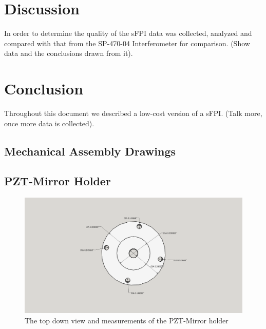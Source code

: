 \documentclass[12pt,journal]{IEEEtran}
\begin{document}
\section{Discussion}
In order to determine the quality of the sFPI data was collected, analyzed and compared with that from the SP-470-04 Interferometer for comparison. (Show data and the conclusions drawn from it).

\section{Conclusion}
Throughout this document we described a low-cost version of a sFPI. (Talk more, once more data is collected).



\begin{appendices}
\onecolumn

\section{Mechanical Assembly Drawings}
\subsection{PZT-Mirror Holder}

\begin{figure}[h!]
  \centering
	\includegraphics[width=\textwidth]{./mechanical/PZT_holder_top.png}
	\caption[Cavity Mounts]{The top down view and measurements of the PZT-Mirror holder}
	\label{fig:PZT-holder-top}
\end{figure}  


\end{appendices}
\end{document}
